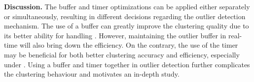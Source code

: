 
\textbf{Discussion.}
The buffer and timer optimizations can be applied either separately or simultaneously, resulting in different decisions regarding the outlier detection mechanism. 
The use of a buffer can greatly improve the clustering quality due to its better ability for handling \oef. However, maintaining the outlier buffer in real-time will also bring down the efficiency. 
On the contrary, the use of the timer may be beneficial for both better clustering accuracy and efficiency, especially under \oef. 
Using a buffer and timer together in outlier detection further complicates the clustering behaviour and motivates an in-depth study.



